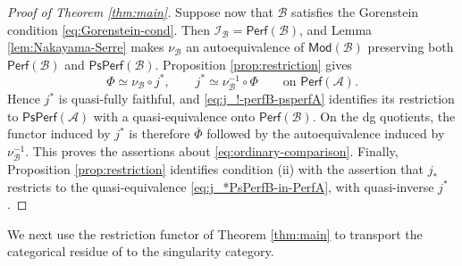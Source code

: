 \documentclass[11pt,letterpaper,reqno]{amsart}
\theoremstyle{plain}
\theoremstyle{definition}
\theoremstyle{plain}
\theoremstyle{definition}
\numberwithin{equation}{section}
\begin{document}
\begin{proof}[Proof of Theorem \ref{thm:main}]
Suppose now that $\mathscr B$ satisfies the Gorenstein condition \eqref{eq:Gorenstein-cond}.
Then $\mathscr I_{\mathscr B}=\mathsf{Perf}(\mathscr B)$, and Lemma \ref{lem:Nakayama-Serre} makes $\nu_{\mathscr B}$ an autoequivalence of $\mathsf{Mod}(\mathscr B)$ preserving both $\mathsf{Perf}(\mathscr B)$ and $\mathsf{PsPerf}(\mathscr B)$.
Proposition \ref{prop:restriction} gives
\[
\Phi\simeq\nu_{\mathscr B}\circ j^*,
\qquad
j^*\simeq\nu_{\mathscr B}^{-1}\circ\Phi
\qquad\text{on }\mathsf{Perf}(\mathscr A).
\]
Hence $j^*$ is quasi-fully faithful, and \eqref{eq:j_!-perfB-psperfA} identifies its restriction to $\mathsf{PsPerf}(\mathscr A)$ with a quasi-equivalence onto $\mathsf{Perf}(\mathscr B)$.
On the dg quotients, the functor induced by $j^*$ is therefore $\overline\Phi$ followed by the autoequivalence induced by $\nu_{\mathscr B}^{-1}$.
This proves the assertions about \eqref{eq:ordinary-comparison}.
Finally, Proposition \ref{prop:restriction} identifies condition \textup{(ii)} with the assertion that $j_*$ restricts to the quasi-equivalence \eqref{eq:j_*PsPerfB-in-PerfA}, with quasi-inverse $j^*$.
\end{proof}

We next use the restriction functor of Theorem \ref{thm:main} to transport the categorical residue of \cite[Theorem 1.7]{Gao2025} to the singularity category.
\end{document}
